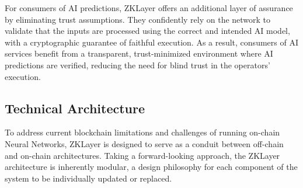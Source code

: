 \documentclass[conference]{IEEEtran}
\begin{document}
For consumers of AI predictions, ZKLayer offers an additional layer of assurance by eliminating trust assumptions. They confidently rely on the network to validate that the inputs are processed using the correct and intended AI model, with a cryptographic guarantee of faithful execution.  As a result, consumers of AI services benefit from a transparent, trust-minimized environment where AI predictions are verified, reducing the need for blind trust in the operators' execution.

\subsection{Technical Architecture}

To address current blockchain limitations and challenges of running on-chain Neural Networks, ZKLayer is designed to serve as a conduit between off-chain and on-chain architectures. Taking a forward-looking approach, the ZKLayer architecture is inherently modular, a design philosophy for each component of the system to be individually updated or replaced.
\end{document}
